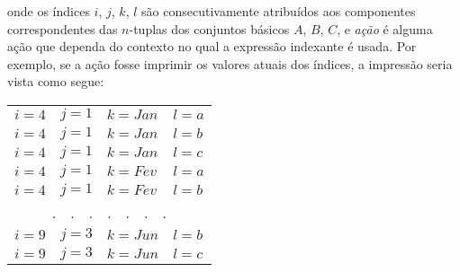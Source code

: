 \documentclass[11pt, brazil]{report}
\begin{document}

\noindent onde os índices $i$, $j$, $k$, $l$ são consecutivamente
atribuídos aos componentes correspondentes das $n$-tuplas dos conjuntos
básicos $A$, $B$, $C$, e {\it ação} é alguma ação que dependa do contexto
no qual a expressão indexante é usada. Por exemplo, se a ação fosse
imprimir os valores atuais dos índices, a impressão seria vista como segue:


\noindent\hfil
\begin{tabular}{@{}llll@{}}
$i=4$&$j=1$&$k=Jan$&$l=a$\\
$i=4$&$j=1$&$k=Jan$&$l=b$\\
$i=4$&$j=1$&$k=Jan$&$l=c$\\
$i=4$&$j=1$&$k=Fev$&$l=a$\\
$i=4$&$j=1$&$k=Fev$&$l=b$\\
\multicolumn{4}{c}{.\ \ .\ \ .\ \ .\ \ .\ \ .\ \ .}\\
$i=9$&$j=3$&$k=Jun$&$l=b$\\
$i=9$&$j=3$&$k=Jun$&$l=c$\\
\end{tabular}

\end{document}
